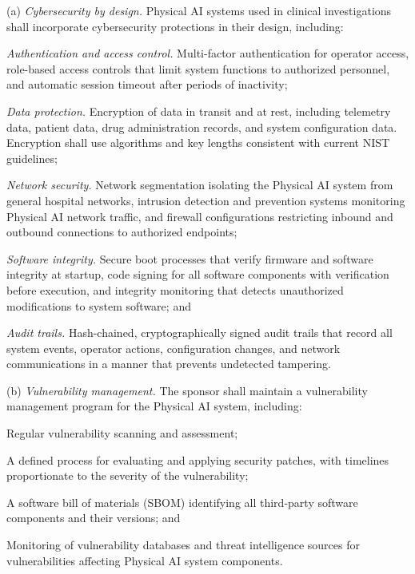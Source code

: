 \documentclass[11pt]{article}
\begin{document}
(a) \textit{Cybersecurity by design.} Physical AI systems used in clinical investigations shall incorporate cybersecurity protections in their design, including:

\begin{description}[leftmargin=0.8cm,style=sameline]
\item[(1)] \textit{Authentication and access control.} Multi-factor authentication for operator access, role-based access controls that limit system functions to authorized personnel, and automatic session timeout after periods of inactivity;
\item[(2)] \textit{Data protection.} Encryption of data in transit and at rest, including telemetry data, patient data, drug administration records, and system configuration data. Encryption shall use algorithms and key lengths consistent with current NIST guidelines;
\item[(3)] \textit{Network security.} Network segmentation isolating the Physical AI system from general hospital networks, intrusion detection and prevention systems monitoring Physical AI network traffic, and firewall configurations restricting inbound and outbound connections to authorized endpoints;
\item[(4)] \textit{Software integrity.} Secure boot processes that verify firmware and software integrity at startup, code signing for all software components with verification before execution, and integrity monitoring that detects unauthorized modifications to system software; and
\item[(5)] \textit{Audit trails.} Hash-chained, cryptographically signed audit trails that record all system events, operator actions, configuration changes, and network communications in a manner that prevents undetected tampering.
\end{description}

(b) \textit{Vulnerability management.} The sponsor shall maintain a vulnerability management program for the Physical AI system, including:

\begin{description}[leftmargin=0.8cm,style=sameline]
\item[(1)] Regular vulnerability scanning and assessment;
\item[(2)] A defined process for evaluating and applying security patches, with timelines proportionate to the severity of the vulnerability;
\item[(3)] A software bill of materials (SBOM) identifying all third-party software components and their versions; and
\item[(4)] Monitoring of vulnerability databases and threat intelligence sources for vulnerabilities affecting Physical AI system components.
\end{description}
\end{document}
